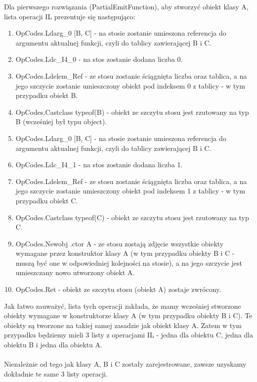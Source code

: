 \documentclass[12pt]{article}
\begin{document}
Dla pierwszego rozwiązania (PartialEmitFunction), aby stworzyć obiekt klasy A, lista operacji IL prezentuje się następująco:
\begin{enumerate}
	\item OpCodes.Ldarg\_0 [B, C] - na stosie zostanie umieszona referencja do argumentu aktualnej funkcji, czyli do tablicy zawierającej B i C.
	\item OpCodes.Ldc\_I4\_0 - na stos zostanie dodana liczba 0.
	\item OpCodes.Ldelem\_Ref - ze stosu zostanie ściągnięta liczba oraz tablica, a na jego szczycie zostanie umieszczony obiekt pod indeksem 0 z tablicy - w tym przypadku obiekt B.
	\item OpCodes.Castclass typeof(B) - obiekt ze szczytu stosu jest rzutowany na typ B (wcześniej był typu object).
	\item OpCodes.Ldarg\_0 [B, C] - na stosie zostanie umieszona referencja do argumentu aktualnej funkcji, czyli do tablicy zawierającej B i C.
	\item OpCodes.Ldc\_I4\_1 - na stos zostanie dodana liczba 1.
	\item OpCodes.Ldelem\_Ref - ze stosu zostanie ściągnięta liczba oraz tablica, a na jego szczycie zostanie umieszczony obiekt pod indeksem 1 z tablicy - w tym przypadku obiekt C.
	\item OpCodes.Castclass typeof(C) - obiekt ze szczytu stosu jest rzutowany na typ C.
	\item OpCodes.Newobj .ctor A - ze stosu zostają zdjęcie wszystkie obiekty wymagane przez konstruktor klasy A (w tym przypadku obiekty B i C - muszą być one w odpowiedniej kolejności na stosie), a na jego szczycie jest umieszczany nowo utworzony obiekt A.
	\item OpCodes.Ret - obiekt ze szczytu stosu (obiekt A) zostaje zwrócony.
\end{enumerate}
Jak łatwo zauważyć, lista tych operacji zakłada, że mamy wcześniej stworzone obiekty wymagane w konstruktorze klasy A (w tym przypadku obiekty B i C). Te obiekty są tworzone na takiej samej zasadzie jak obiekt klasy A. Zatem w tym przypadku będziemy mieli 3 listy z operacjami IL - jedna dla obiektu C, jedna dla obiektu B i jedna dla obiektu A.\\
\\
Niezależnie od tego jak klasy A, B i C zostały zarejestrowane, zawsze uzyskamy dokładnie te same 3 listy operacji.\\
\end{document}
